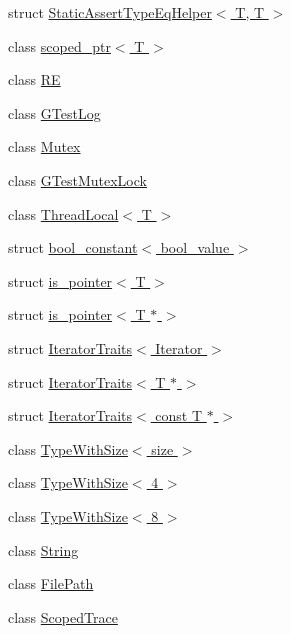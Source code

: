 \begin{DoxyCompactItemize}
struct \hyperlink{structtesting_1_1internal_1_1StaticAssertTypeEqHelper_3_01T_00_01T_01_4}{\-Static\-Assert\-Type\-Eq\-Helper$<$ T, T $>$}
\item 
class \hyperlink{classtesting_1_1internal_1_1scoped__ptr}{scoped\-\_\-ptr$<$ T $>$}
\item 
class \hyperlink{classtesting_1_1internal_1_1RE}{\-R\-E}
\item 
class \hyperlink{classtesting_1_1internal_1_1GTestLog}{\-G\-Test\-Log}
\item 
class \hyperlink{classtesting_1_1internal_1_1Mutex}{\-Mutex}
\item 
class \hyperlink{classtesting_1_1internal_1_1GTestMutexLock}{\-G\-Test\-Mutex\-Lock}
\item 
class \hyperlink{classtesting_1_1internal_1_1ThreadLocal}{\-Thread\-Local$<$ T $>$}
\item 
struct \hyperlink{structtesting_1_1internal_1_1bool__constant}{bool\-\_\-constant$<$ bool\-\_\-value $>$}
\item 
struct \hyperlink{structtesting_1_1internal_1_1is__pointer}{is\-\_\-pointer$<$ T $>$}
\item 
struct \hyperlink{structtesting_1_1internal_1_1is__pointer_3_01T_01_5_01_4}{is\-\_\-pointer$<$ T $\ast$ $>$}
\item 
struct \hyperlink{structtesting_1_1internal_1_1IteratorTraits}{\-Iterator\-Traits$<$ Iterator $>$}
\item 
struct \hyperlink{structtesting_1_1internal_1_1IteratorTraits_3_01T_01_5_01_4}{\-Iterator\-Traits$<$ T $\ast$ $>$}
\item 
struct \hyperlink{structtesting_1_1internal_1_1IteratorTraits_3_01const_01T_01_5_01_4}{\-Iterator\-Traits$<$ const T $\ast$ $>$}
\item 
class \hyperlink{classtesting_1_1internal_1_1TypeWithSize}{\-Type\-With\-Size$<$ size $>$}
\item 
class \hyperlink{classtesting_1_1internal_1_1TypeWithSize_3_014_01_4}{\-Type\-With\-Size$<$ 4 $>$}
\item 
class \hyperlink{classtesting_1_1internal_1_1TypeWithSize_3_018_01_4}{\-Type\-With\-Size$<$ 8 $>$}
\item 
class \hyperlink{classtesting_1_1internal_1_1String}{\-String}
\item 
class \hyperlink{classtesting_1_1internal_1_1FilePath}{\-File\-Path}
\item 
class \hyperlink{classtesting_1_1internal_1_1ScopedTrace}{\-Scoped\-Trace}
\item 

\end{DoxyCompactItemize}
